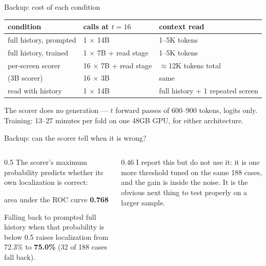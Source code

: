 \documentclass[aspectratio=169,10pt]{beamer}
\newcommand{\gr}[1]{{\color{ncgray}#1}}
\begin{document}
\begin{frame}{Backup: cost of each condition}
\vspace{0.5cm}
\centering\small
\begin{tabular}{lll}
\toprule
condition & calls at $t=16$ & context read\\
\midrule
full history, prompted & 1 $\times$ 14B & 1--5K tokens\\
full history, trained & 1 $\times$ 7B \gr{+ read stage} & 1--5K tokens\\
per-screen scorer & 16 $\times$ 7B \gr{+ read stage} & $\approx$12K tokens total\\
\gr{(3B scorer)} & \gr{16 $\times$ 3B} & \gr{same}\\
read with history & 1 $\times$ 14B & full history + 1 repeated screen\\
\bottomrule
\end{tabular}
\vspace{0.9cm}
The scorer does no generation --- $t$ forward passes of 600--900 tokens, logits only.\\[0.4em]
\gr{Training: 13--27 minutes per fold on one 48GB GPU, for either architecture.}
\end{frame}

\begin{frame}{Backup: can the scorer tell when it is wrong?}
\vspace{0.6cm}
\begin{columns}[T]
\begin{column}{0.5\textwidth}
The scorer's maximum probability predicts whether its own localization is correct:
\vspace{0.5em}
\begin{block}{}
\centering area under the ROC curve \textbf{0.768}
\end{block}
\vspace{0.5em}
Falling back to prompted full history when that probability is below 0.5 raises localization from 72.3\% to \textbf{75.0\%} \gr{(32 of 188 cases fall back)}.
\end{column}
\begin{column}{0.46\textwidth}
\vspace{0.4cm}
I report this but do not use it: it is one more threshold tuned on the same 188 cases, and the gain is inside the noise.
\vspace{0.8em}
\gr{It is the obvious next thing to test properly on a larger sample.}
\end{column}
\end{columns}
\end{frame}
\end{document}
